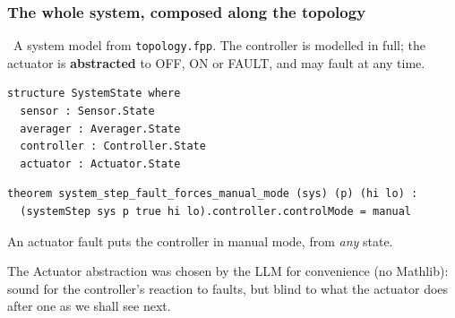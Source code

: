 \begin{frame}[fragile]
  \frametitle{The whole system, composed along the topology} \small
{}

\vspace{-0.2cm}

\vspace{0.3cm}
\iconllm[0.85]\ A system model from {\tt topology.fpp}. The controller is modelled in
full; the actuator is {\bf abstracted} to OFF, ON or FAULT, and may fault at any time.

\vspace{0.3cm}
\begin{lstlisting}[language=lean4]
structure SystemState where
  sensor : Sensor.State
  averager : Averager.State
  controller : Controller.State
  actuator : Actuator.State
\end{lstlisting}

\vspace{0.25cm}
\begin{lstlisting}[language=lean4]
theorem system_step_fault_forces_manual_mode (sys) (p) (hi lo) :
  (systemStep sys p true hi lo).controller.controlMode = manual
\end{lstlisting}

\vspace{0.1cm}
{\small An actuator fault puts the controller in manual mode, from {\em any} state.}

\vspace{0.2cm}
{\scriptsize The Actuator abstraction was chosen by the LLM for convenience (no Mathlib): sound for the
controller's reaction to faults, but blind to what the actuator does after one as we shall see next.}

\end{frame}
